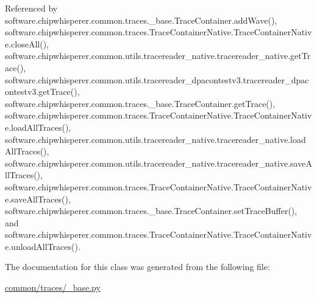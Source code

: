 Referenced by software.\+chipwhisperer.\+common.\+traces.\+\_\+base.\+Trace\+Container.\+add\+Wave(), software.\+chipwhisperer.\+common.\+traces.\+Trace\+Container\+Native.\+Trace\+Container\+Native.\+close\+All(), software.\+chipwhisperer.\+common.\+utils.\+tracereader\+\_\+native.\+tracereader\+\_\+native.\+get\+Trace(), software.\+chipwhisperer.\+common.\+utils.\+tracereader\+\_\+dpacontestv3.\+tracereader\+\_\+dpacontestv3.\+get\+Trace(), software.\+chipwhisperer.\+common.\+traces.\+\_\+base.\+Trace\+Container.\+get\+Trace(), software.\+chipwhisperer.\+common.\+traces.\+Trace\+Container\+Native.\+Trace\+Container\+Native.\+load\+All\+Traces(), software.\+chipwhisperer.\+common.\+utils.\+tracereader\+\_\+native.\+tracereader\+\_\+native.\+load\+All\+Traces(), software.\+chipwhisperer.\+common.\+utils.\+tracereader\+\_\+native.\+tracereader\+\_\+native.\+save\+All\+Traces(), software.\+chipwhisperer.\+common.\+traces.\+Trace\+Container\+Native.\+Trace\+Container\+Native.\+save\+All\+Traces(), software.\+chipwhisperer.\+common.\+traces.\+\_\+base.\+Trace\+Container.\+set\+Trace\+Buffer(), and software.\+chipwhisperer.\+common.\+traces.\+Trace\+Container\+Native.\+Trace\+Container\+Native.\+unload\+All\+Traces().



The documentation for this class was generated from the following file\+:\begin{DoxyCompactItemize}
\item 
\hyperlink{common_2traces_2__base_8py}{common/traces/\+\_\+base.\+py}\end{DoxyCompactItemize}

